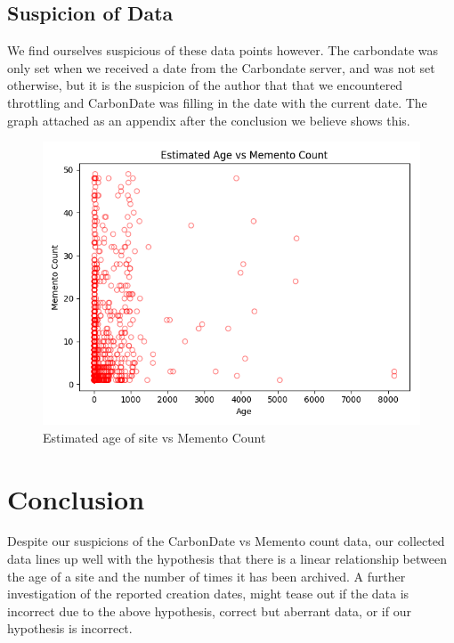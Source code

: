 \documentclass[11pt]{article}
\begin{document}
	\subsection{Suspicion of Data}
	\hspace{10mm} We find ourselves suspicious of these data points however. The carbondate was only set when we received a date from the Carbondate server, and was not set otherwise, but it is the suspicion of the author that that we encountered throttling and CarbonDate was filling in the date with the current date. The graph attached as an appendix after the conclusion we believe shows this. 
	\begin{figure}[h!]
		\includegraphics[scale=0.6]{resources/carbondate50.png}
		\caption{Estimated age of site vs Memento Count}
	\end{figure}
	\section{Conclusion}
		Despite our suspicions of the CarbonDate vs Memento count data, our collected data lines up well with the hypothesis that there is a linear relationship between the age of a site and the number of times it has been archived. A further investigation of the reported creation dates, might tease out if the data is incorrect due to the above hypothesis, correct but aberrant data, or if our hypothesis is incorrect. 
	  
	
	
	
	
	
\end{document}
